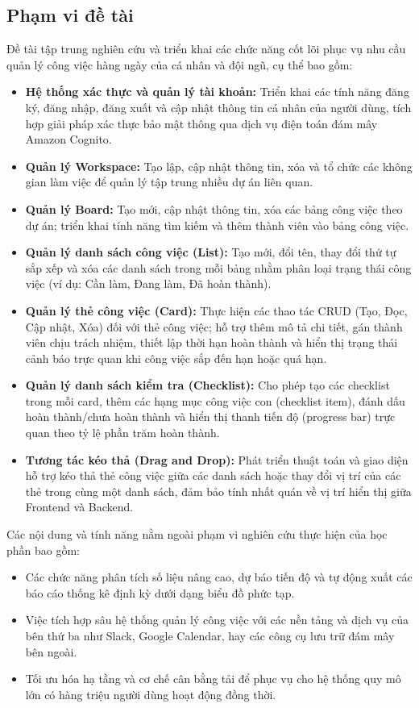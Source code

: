 \subsection{Phạm vi đề tài}
Đề tài tập trung nghiên cứu và triển khai các chức năng cốt lõi phục vụ nhu cầu quản lý công việc hàng ngày của cá nhân và đội ngũ, cụ thể bao gồm:
\begin{itemize}
    \item \textbf{Hệ thống xác thực và quản lý tài khoản:} Triển khai các tính năng đăng ký, đăng nhập, đăng xuất và cập nhật thông tin cá nhân của người dùng, tích hợp giải pháp xác thực bảo mật thông qua dịch vụ điện toán đám mây Amazon Cognito.
    \item \textbf{Quản lý Workspace:} Tạo lập, cập nhật thông tin, xóa và tổ chức các không gian làm việc để quản lý tập trung nhiều dự án liên quan.
    \item \textbf{Quản lý Board:} Tạo mới, cập nhật thông tin, xóa các bảng công việc theo dự án; triển khai tính năng tìm kiếm và thêm thành viên vào bảng công việc.
    \item \textbf{Quản lý danh sách công việc (List):} Tạo mới, đổi tên, thay đổi thứ tự sắp xếp và xóa các danh sách trong mỗi bảng nhằm phân loại trạng thái công việc (ví dụ: Cần làm, Đang làm, Đã hoàn thành).
    \item \textbf{Quản lý thẻ công việc (Card):} Thực hiện các thao tác CRUD (Tạo, Đọc, Cập nhật, Xóa) đối với thẻ công việc; hỗ trợ thêm mô tả chi tiết, gán thành viên chịu trách nhiệm, thiết lập thời hạn hoàn thành và hiển thị trạng thái cảnh báo trực quan khi công việc sắp đến hạn hoặc quá hạn.
    \item \textbf{Quản lý danh sách kiểm tra (Checklist):} Cho phép tạo các checklist trong mỗi card, thêm các hạng mục công việc con (checklist item), đánh dấu hoàn thành/chưa hoàn thành và hiển thị thanh tiến độ (progress bar) trực quan theo tỷ lệ phần trăm hoàn thành.
    \item \textbf{Tương tác kéo thả (Drag and Drop):} Phát triển thuật toán và giao diện hỗ trợ kéo thả thẻ công việc giữa các danh sách hoặc thay đổi vị trí của các thẻ trong cùng một danh sách, đảm bảo tính nhất quán về vị trí hiển thị giữa Frontend và Backend.
\end{itemize}
Các nội dung và tính năng nằm ngoài phạm vi nghiên cứu thực hiện của học phần bao gồm:
\begin{itemize}
    \item Các chức năng phân tích số liệu nâng cao, dự báo tiến độ và tự động xuất các báo cáo thống kê định kỳ dưới dạng biểu đồ phức tạp.
    \item Việc tích hợp sâu hệ thống quản lý công việc với các nền tảng và dịch vụ của bên thứ ba như Slack, Google Calendar, hay các công cụ lưu trữ đám mây bên ngoài.
    \item Tối ưu hóa hạ tầng và cơ chế cân bằng tải để phục vụ cho hệ thống quy mô lớn có hàng triệu người dùng hoạt động đồng thời.
\end{itemize}

